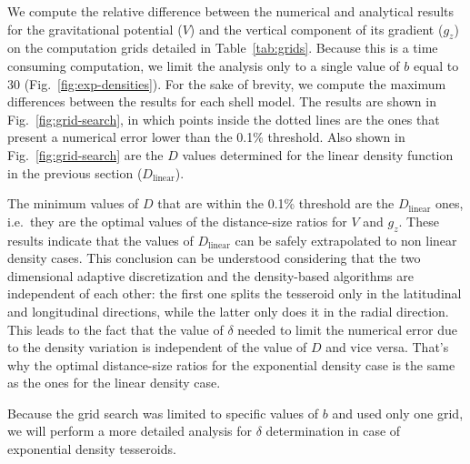 \documentclass[extra, referee]{gji}
\begin{document}
We compute the relative difference between the numerical and analytical results for the
gravitational potential ($V$) and the vertical component of its gradient ($g_z$) on the
computation grids detailed in Table~\ref{tab:grids}.
Because this is a time consuming computation, we limit the analysis only to a single
value of $b$ equal to 30 (Fig.~\ref{fig:exp-densities}).
For the sake of brevity, we compute the maximum differences between the results for each
shell model.
The results are shown in Fig.~\ref{fig:grid-search}, in which points inside the dotted
lines are the ones that present a numerical error lower than the 0.1\% threshold.
Also shown in Fig.~\ref{fig:grid-search} are the $D$ values determined for the linear
density function in the previous section ($D_\text{linear}$).

The minimum values of $D$ that are within the 0.1\% threshold are the $D_\text{linear}$
ones, i.e.~they are the optimal values of the distance-size ratios for $V$ and $g_z$.
These results indicate that the values of $D_\text{linear}$ can be safely extrapolated
to non linear density cases.
This conclusion can be understood considering that the two dimensional adaptive
discretization and the density-based algorithms are independent of each other: the first
one splits the tesseroid only in the latitudinal and longitudinal directions, while the
latter only does it in the radial direction.
This leads to the fact that the value of $\delta$ needed to limit the numerical error
due to the density variation is independent of the value of $D$ and vice versa.
That's why the optimal distance-size ratios for the exponential density case is the same
as the ones for the linear density case.

Because the grid search was limited to specific values of $b$ and used only one grid, we
will perform a more detailed analysis for $\delta$ determination in case of exponential
density tesseroids.
\end{document}

